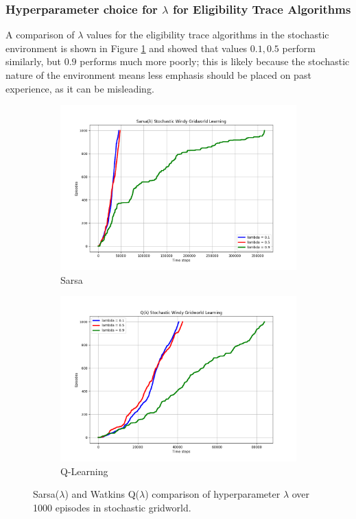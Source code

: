 \documentclass{article}
\begin{document}
\subsubsection{Hyperparameter choice for $\lambda$ for Eligibility Trace Algorithms}

A comparison of $\lambda$ values for the eligibility trace algorithms in the stochastic environment is shown in Figure \ref{fig:lambda_stochastic_comparison} and showed that values $0.1, 0.5$ perform similarly, but $0.9$ performs much more poorly; this is likely because the stochastic nature of the environment means less emphasis should be placed on past experience, as it can be misleading. 

\begin{figure}[h!]
  \centering
  \begin{subfigure}{0.45\textwidth} 
    \includegraphics[width=\textwidth]{sarsa_stochastic_lambda_choice.png}
    \caption{Sarsa}
  \end{subfigure}
  \hspace{0.05\textwidth}  
  \begin{subfigure}{0.45\textwidth}  
    \includegraphics[width=\textwidth]{q_stochastic_lambda_choice.png}
    \caption{Q-Learning}
  \end{subfigure}
  \caption{Sarsa($\lambda$) and Watkins Q($\lambda$) comparison of hyperparameter $\lambda$ over 1000 episodes in stochastic gridworld.}
  \label{fig:lambda_stochastic_comparison}
\end{figure}
\end{document}
